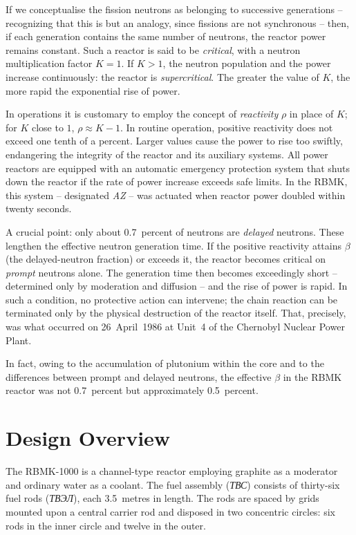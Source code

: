 \documentclass[openright]{bookest}
\begin{document}
If we conceptualise the fission neutrons as belonging to successive generations -- recognizing that this is but an analogy, since fissions are not synchronous -- then, if each generation contains the same number of neutrons, the reactor power remains constant. Such a reactor is said to be \textit{critical}, with a neutron multiplication factor $K = 1$. If $K > 1$, the neutron population and the power increase continuously: the reactor is \textit{supercritical}. The greater the value of $K$, the more rapid the exponential rise of power.

In operations it is customary to employ the concept of \textit{reactivity} $\rho$ in place of $K$; for $K$ close to $1$, $\rho \approx K - 1$. In routine operation, positive reactivity does not exceed one tenth of a percent. Larger values cause the power to rise too swiftly, endangering the integrity of the reactor and its auxiliary systems. All power reactors are equipped with an automatic emergency protection system that shuts down the reactor if the rate of power increase exceeds safe limits. In the RBMK, this system -- designated \textit{AZ} -- was actuated when reactor power doubled within twenty seconds.

A crucial point: only about \num{0.7}~percent of neutrons are \textit{delayed} neutrons. These lengthen the effective neutron generation time. If the positive reactivity attains $\beta$ (the delayed-neutron fraction) or exceeds it, the reactor becomes critical on \textit{prompt} neutrons alone. The generation time then becomes exceedingly short -- determined only by moderation and diffusion -- and the rise of power is rapid. In such a condition, no protective action can intervene; the chain reaction can be terminated only by the physical destruction of the reactor itself. That, precisely, was what occurred on 26~April~1986 at Unit~4 of the Chernobyl Nuclear Power Plant.

In fact, owing to the accumulation of plutonium within the core and to the differences between prompt and delayed neutrons, the effective $\beta$ in the RBMK reactor was not \num{0.7}~percent but approximately \num{0.5}~percent.

\section{Design Overview}

The RBMK-1000 is a channel-type reactor employing graphite as a moderator and ordinary water as a coolant. The fuel assembly (\textit{ТВС}) consists of thirty-six fuel rods (\textit{ТВЭЛ}), each \num{3.5}~metres in length. The rods are spaced by grids mounted upon a central carrier rod and disposed in two concentric circles: six rods in the inner circle and twelve in the outer.
\end{document}
